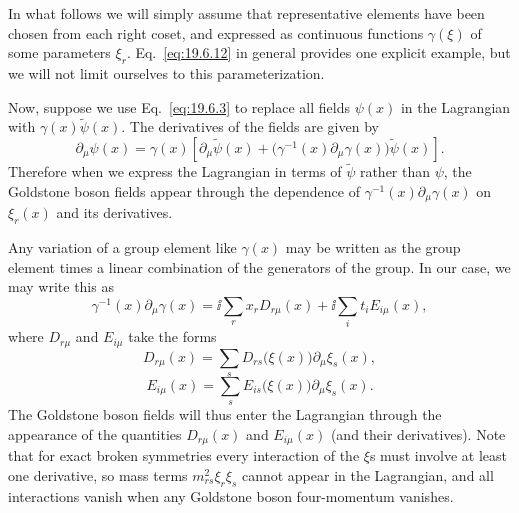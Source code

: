 In what follows we will simply assume that representative elements have been chosen from each right coset, and expressed as continuous functions $\gamma(\xi)$ of some parameters $\xi_r$. Eq.~\eqref{eq:19.6.12} in general provides one explicit example, but we will not limit ourselves to this parameterization.

Now, suppose we use Eq.~\eqref{eq:19.6.3} to replace all fields $\psi(x)$ in the Lagrangian with $\gamma(x)\widetilde\psi(x)$. The derivatives of the fields are given by
\begin{equation}
\partial_\mu\psi(x)
=\gamma(x)\left[
\partial_\mu\widetilde\psi(x)
+\bigl(\gamma^{-1}(x)\partial_\mu\gamma(x)\bigr)
\widetilde\psi(x)\right].
\tag{19.6.13}\label{eq:19.6.13}
\end{equation}
Therefore when we express the Lagrangian in terms of $\widetilde\psi$ rather than $\psi$, the Goldstone boson fields appear through the dependence of $\gamma^{-1}(x)\partial_\mu\gamma(x)$ on $\xi_r(x)$ and its derivatives.

Any variation of a group element like $\gamma(x)$ may be written as the group element times a linear combination of the generators of the group. In our case, we may write this as
\begin{equation}
\gamma^{-1}(x)\partial_\mu\gamma(x)
=\ii\sum_r x_rD_{r\mu}(x)+\ii\sum_i t_iE_{i\mu}(x),
\tag{19.6.14}\label{eq:19.6.14}
\end{equation}
where $D_{r\mu}$ and $E_{i\mu}$ take the forms
\begin{equation}
D_{r\mu}(x)=\sum_sD_{rs}\bigl(\xi(x)\bigr)\partial_\mu\xi_s(x),
\tag{19.6.15}\label{eq:19.6.15}
\end{equation}
\begin{equation}
E_{i\mu}(x)=\sum_sE_{is}\bigl(\xi(x)\bigr)\partial_\mu\xi_s(x).
\tag{19.6.16}\label{eq:19.6.16}
\end{equation}
The Goldstone boson fields will thus enter the Lagrangian through the appearance of the quantities $D_{r\mu}(x)$ and $E_{i\mu}(x)$ (and their derivatives). Note that for exact broken symmetries every interaction of the $\xi$s must involve at least one derivative, so mass terms $m^2_{rs}\xi_r\xi_s$ cannot appear in the Lagrangian, and all interactions vanish when any Goldstone boson four-momentum vanishes.

